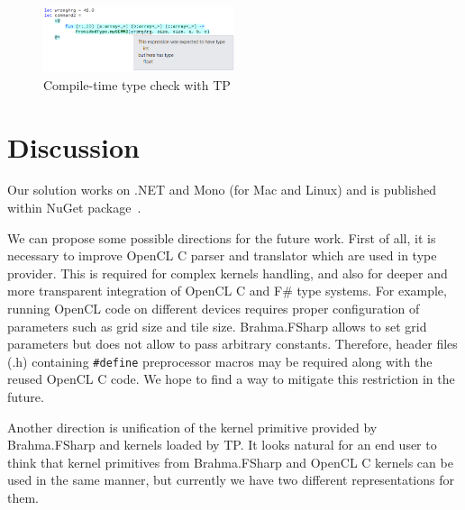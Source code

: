 \documentclass[sigplan]{acmart}\settopmatter{}
\begin{document}
\begin{figure}[h]
\centering
\includegraphics[width=0.5\textwidth]{graphics/example-compile-error.png}
\caption{Compile-time type check with TP}
\label{pic:error}
\end{figure}

\section{Discussion}

Our solution works on .NET and Mono (for Mac and Linux) and is published within NuGet package~\cite{Brahma.FSharp.NuGet}.

We can propose some possible directions for the future work. First of all, it is necessary to improve OpenCL C parser and translator which are used in type provider.
This is required for complex kernels handling, and also for deeper and more transparent integration of OpenCL C and F\# type systems.
For example, running OpenCL code on different devices requires proper configuration of parameters such as grid size and tile size. 
Brahma.FSharp allows to set grid parameters but does not allow to pass arbitrary constants. 
Therefore, header files (.h) containing \lstinline{#define} preprocessor macros may be required along with the reused OpenCL C code. 
We hope to find a way to mitigate this restriction in the future.

Another direction is unification of the kernel primitive provided by Brahma.FSharp and kernels loaded by TP.
It looks natural for an end user to think that kernel primitives from Brahma.FSharp and OpenCL C kernels can be used in the same manner, but currently we have two different representations for them.





\end{document}
